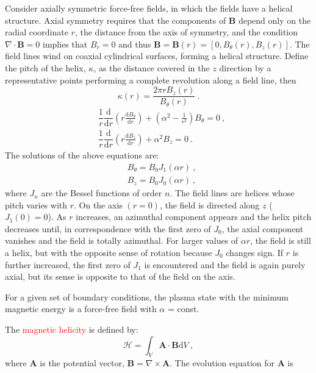 \documentclass[12pt,a4paper]{article}
\renewcommand{\vec}[1]{\boldsymbol{#1}}
\newcommand{\dif}{\mathrm{d}}
\newcounter{theo}[section]\setcounter{theo}{0}
\begin{document}
Consider axially symmetric force-free fields, in which the fields have a helical structure. Axial symmetry requires that the components of $\vec{B}$ depend only on the radial coordinate $r$, the distance from the axis of symmetry, and the condition $\nabla \cdot \vec{B} = 0$ implies that $B_r = 0$ and thus $\vec{B} = \vec{B}(r) = [0, B_\theta (r), B_z(r)]$. The field lines wind on coaxial cylindrical surfaces, forming a helical structure. Define the pitch of the helix, $\kappa$, as the distance covered in the $z$ direction by a representative points performing a complete revolution along a field line, then
\begin{equation*}
\kappa(r) = \dfrac{2\pi r B_z(r)}{B_\theta(r)} ~.
\end{equation*}
\begin{align*}
& \dfrac{1}{r} \dfrac{\dif }{\dif r} \left(r\frac{\dif B_\theta}{\dif r} \right) +\left(\alpha^2 -\frac{1}{r^2} \right) B_\theta = 0 ~, \\
& \dfrac{1}{r} \dfrac{\dif }{\dif r} \left(r\frac{\dif B_z}{\dif r} \right) +\alpha^2 B_z = 0 ~.
\end{align*}
The solutions of the above equations are:
\begin{align}
& B_\theta = B_0 J_1(\alpha r) ~, \\
& B_z = B_0 J_0(\alpha r) ~,
\end{align}
where $J_n$ are the Bessel functions of order $n$. The field lines are helices whose pitch varies with $r$. On the axis $(r = 0)$, the field is directed along $z$ ($J_1(0) = 0$). As $r$ increases, an azimuthal component appears and the helix pitch decreases until, in correspondence with the first zero of $J_0$, the axial component vanishes and the field is totally azimuthal. For larger values of $\alpha r$, the field is still a helix, but with the opposite sense of rotation because $J_0$ changes sign. If $r$ is further increased, the first zero of $J_1$ is encountered and the field is again purely axial, but its sense is opposite to that of the field on the axis.







\begin{tcolorbox}[colback=green!5,colframe=green!40!black,title=Woltjer's theorem]
For a given set of boundary conditions, the plasma state with the minimum magnetic energy is a force-free field with $\alpha$ = const.
\end{tcolorbox}
The \textcolor{red}{magnetic helicity} is defined by:
\begin{equation}
\mathcal H = \int_V \vec{A} \cdot \vec{B} \dif V ~,
\end{equation}
where $\vec{A}$ is the potential vector, $\vec{B} = \nabla \times \vec{A}$. The evolution equation for $\vec{A}$ is
\end{document}

